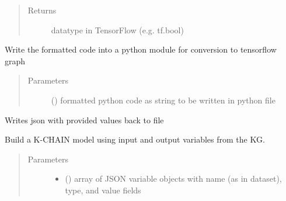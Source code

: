 \documentclass[letterpaper,10pt,english]{sphinxmanual}
\begin{document}
\begin{fulllineitems}
\begin{fulllineitems}
\begin{quote}
\begin{description}
\item[{Returns}] \leavevmode
datatype in TensorFlow   (e.g. tf.bool)

\end{description}\end{quote}

\end{fulllineitems}


\begin{fulllineitems}
\label{\detokenize{index:kChain.kChainModel._makePyFile}}
Write the formatted code into a python module for conversion to tensorflow graph
\begin{quote}\begin{description}
\item[{Parameters}] \leavevmode
{} () \textendash{} formatted python code as string to be written in python file

\end{description}\end{quote}

\end{fulllineitems}


\begin{fulllineitems}
\label{\detokenize{index:kChain.kChainModel._setDefaultValues}}
Writes json with provided values back to file

\end{fulllineitems}


\begin{fulllineitems}
\label{\detokenize{index:kChain.kChainModel.build}}
Build a K-CHAIN model using input and output variables from the KG.
\begin{quote}\begin{description}
\item[{Parameters}] \leavevmode\begin{itemize}
\item {} 
 () \textendash{} array of JSON variable objects with name (as in dataset), type, and value fields


\end{itemize}
\end{description}
\end{quote}
\end{fulllineitems}
\end{fulllineitems}
\end{document}
